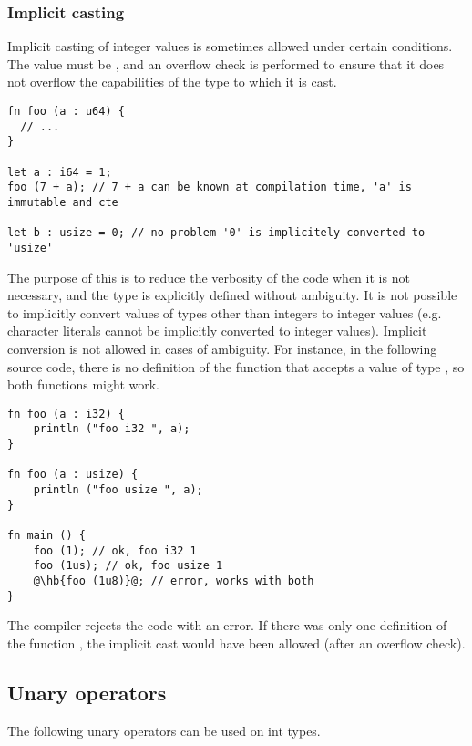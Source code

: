 \subsubsection{Implicit casting}

Implicit casting of integer values is sometimes allowed under certain
conditions. The value must be , and an overflow check is performed
to ensure that it does not overflow the capabilities of the type to which it is
cast.

  \begin{lstlisting}[style=coloredverbatim]
fn foo (a : u64) {
  // ...
}

let a : i64 = 1;
foo (7 + a); // 7 + a can be known at compilation time, 'a' is immutable and cte

let b : usize = 0; // no problem '0' is implicitely converted to 'usize'
  \end{lstlisting}

The purpose of this is to reduce the verbosity of the code when it is not
necessary, and the type is explicitly defined without ambiguity. It is not
possible to implicitly convert values of types other than integers to integer
values (e.g. character literals cannot be implicitly converted to integer
values). Implicit conversion is not allowed in cases of ambiguity. For instance,
in the following source code, there is no definition of the function
 that accepts a value of type , so both functions might
work.

\begin{lstlisting}[style=coloredverbatim, escapechar=@]
fn foo (a : i32) {
    println ("foo i32 ", a);
}

fn foo (a : usize) {
    println ("foo usize ", a);
}

fn main () {
    foo (1); // ok, foo i32 1
    foo (1us); // ok, foo usize 1
    @\hb{foo (1u8)}@; // error, works with both
}
  \end{lstlisting}

The compiler rejects the code with an error. If there was only one definition of
the function , the implicit cast would have been allowed (after an
overflow check).

\subsection{Unary operators}
\label{sec:orge691bb5}

The following unary operators can be used on int types.
\smallskip



